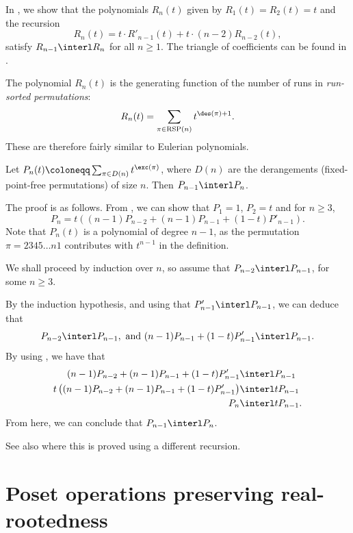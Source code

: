 \begin{example*}
In \cite{AlexanderssonNabawanda2021}, we show that the polynomials $R_n(t)$
given by $R_1(t)=R_2(t)=t$ and the recursion
\begin{equation}
R_n(t) = t\cdot R'_{n-1}(t) + t\cdot (n-2) R_{n-2}(t),
\end{equation}
satisfy $R_{n-1} \interl R_{n}$ for all $n \geq 1$.
The triangle of coefficients can be found in .

The polynomial $R_n(t)$ is the generating function of the number of runs in \emph{run-sorted permutations}:
\[
 R_n(t) = \sum_{\pi \in \text{RSP}(n)} t^{\des(\pi)+1}.
\]
These are therefore fairly similar to Eulerian polynomials.
\end{example*}


\begin{example*}
Let $P_n(t)\coloneqq \sum_{\pi \in D(n)} t^{\exc(\pi)}$,
where $D(n)$ are the derangements (fixed-point-free permutations) of size $n$.
Then $P_{n-1} \interl P_n$.

The proof is as follows.
From \cite{MantaciRakotondrajao2003}, we can show that $P_1 =1$, $P_2 =t$ and for $n \geq 3$,
\[
 P_n = t \left( (n - 1) P_{n - 2} + (n-1)  P_{n - 1} + (1-t) P'_{n - 1} \right).
\]
Note that $P_n(t)$ is a polynomial of degree $n-1$, as the
permutation $\pi=2345\dotsc n 1$ contributes with $t^{n-1}$ in the definition.

We shall proceed by induction over $n$,
so assume that $P_{n-2} \interl P_{n-1}$, for some $n\geq 3$.

By the induction hypothesis, and using that $P'_{n-1} \interl P_{n-1}$, we can deduce that
\[
  P_{n-2} \interl P_{n-1}, \text{ and }
 (n-1)P_{n-1} + (1-t)P'_{n-1} \interl P_{n-1}.
\]
By using \cite{Wagner1992}, we have that
\begin{align*}
 (n-1)P_{n - 2} + (n-1)P_{n - 1} + (1-t)P'_{n-1} &\interl P_{n-1} \\
 t\left((n-1)P_{n - 2} + (n-1)P_{n - 1} + (1-t)P'_{n-1}\right) &\interl t P_{n-1} \\
 P_{n} &\interl t P_{n-1}.
\end{align*}
From here, we can conclude that $P_{n-1} \interl P_n$.

See also \cite{Liu2007} where this is proved using a different recursion.
\end{example*}


\section[posetRealRooted]{Poset operations preserving real-rootedness}

